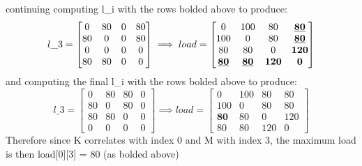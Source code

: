 \documentclass[12pt]{article}
\begin{document}
continuing computing l\_i with the rows bolded above to produce:
\[  l\_3 =
\begin{bmatrix}
    0   & 80   & 0   & 80   \\
    80   & 0   & 0   & 80   \\
    0   & 0   & 0   & 0   \\
    80   & 80   & 0   & 0
\end{bmatrix}
\implies load =
\begin{bmatrix}
    0   & 100 & 80  & \textbf{\underline{80}}   \\
    100 & 0   & 80  & \textbf{\underline{80}}   \\
    80  & 80  & 0   & \textbf{120} \\
    \textbf{\underline{80}}  & \textbf{\underline{80}}  & \textbf{120} & \textbf{0}
\end{bmatrix}
\]
and computing the final l\_i with the rows bolded above to produce:
\[  l\_3 =
\begin{bmatrix}
    0   & 80   & 80   & 0   \\
    80   & 0   & 80   & 0   \\
    80   & 80   & 0   & 0   \\
    0   & 0   & 0   & 0
\end{bmatrix}
\implies load =
\begin{bmatrix}
    0   & 100 & 80  & 80   \\
    100 & 0   & 80  & 80   \\
    \textbf{80}  & 80  & 0   & 120 \\
    80  & 80  & 120 & 0
\end{bmatrix}
\]
Therefore since K correlates with index 0 and M with index 3, the maximum load is
then load[0][3] = 80 (as bolded above)


\newpage
\end{document}
